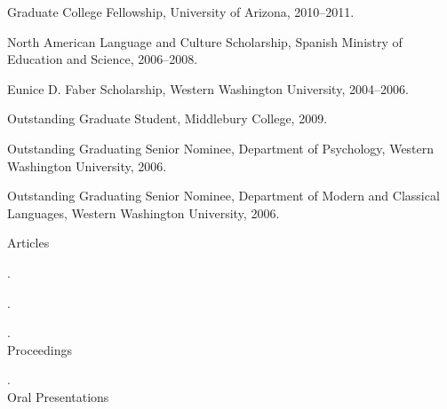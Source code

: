 \documentclass[11pt]{article}
\begin{document}
\noindent Graduate College Fellowship, University of Arizona, 2010--2011.\\ \vspace{-0.1in}

\noindent North American Language and Culture Scholarship, Spanish Ministry of Education and Science, 2006--2008. \\ \vspace{-0.1in}

\noindent Eunice D. Faber Scholarship, Western Washington University, 2004--2006.


\bigskip


\medskip
\noindent Outstanding Graduate Student, Middlebury College, 2009. \\ \vspace{-0.1in}

\noindent Outstanding Graduating Senior Nominee, Department of Psychology, Western Washington University, 2006. \\ \vspace{-0.1in}

\noindent Outstanding Graduating Senior Nominee, Department of Modern and Classical Languages, Western Washington University, 2006.


\bigskip


\nobibliography*

\noindent Articles \\ \vspace{-0.1in}

\noindent {}. \\ \vspace{-0.1in}

\noindent {}. \\ \vspace{-0.1in}

\noindent {}. \\ 




\noindent Proceedings \\ \vspace{-0.1in}

\noindent {}. \\




\noindent Oral Presentations \\ \vspace{-0.1in}
\end{document}
